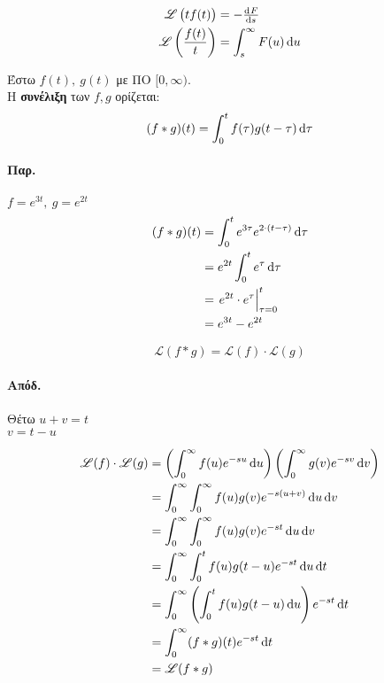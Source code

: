 \documentclass[11pt,a4paper,titlepage,final]{article}
\begin{document}
\begin{theorem*}{}
\begin{align*}
\mathscr L\left( t f(t)\right) &= - \od{F}{s} \\
\mathscr L \left( \frac{f(t)}{t}\right) &= \int_s^\infty F(u) \dif u
\end{align*}

\end{theorem*}

\begin{defn*}{}
Έστω \(f(t),\ g(t)\) με ΠΟ \( [0,\infty) \). \\
Η \textbf{συνέλιξη} των \(f,g\) ορίζεται:
\[
(f*g)(t) = \int_0^t f(\tau)g(t-\tau)\dif\tau
\]
\end{defn*}

\paragraph{Παρ.}
\(f=e^{3t},\ g=e^{2t}\)
\begin{align*}
(f*g)(t) &= \int_0^t e^{3\tau} e^{2\cdot(t-\tau)}\dif \tau
\\ &=
e^{2t} \int_0^t e^\tau \dif\tau \\
&= \left. e^{2t} \cdot e^\tau  \right|_{\tau=0}^t
\\ &= e^{3t}-e^{2t}
\end{align*}

\begin{theorem*}{}
\[
\mathscr L \left(
f * g
\right) = \mathscr L(f) \cdot \mathscr L(g)
\]
\end{theorem*}
\paragraph{Απόδ.}
Θέτω \(u+v=t\) \\ \(v=t-u\)

\begin{align*}
\mathscr L(f) \cdot \mathscr L(g) &=
\left(
\int_0^\infty f(u) e^{-su} \dif u
\right)\left(
\int_0^\infty g(v)e^{-sv}\dif v
\right)
\\
&=
\int_0^\infty \int_0^\infty f(u)g(v)e^{-s(u+v)}\dif u \dif v
\\ &=
\int_0^\infty \int_0^\infty f(u)g(v) e^{-st} \dif u \dif v
\\ &= \int_0^\infty \int_0^t f(u)g(t - u)e^{-st} \dif u \dif t
\\ &= \int_0^\infty \left(
\int_0^t f(u) g(t-u) \dif u
\right) e^{-st} \dif t
\\ &= \int_0^\infty (f*g)(t)e^{-st} \dif t\\
&= \mathscr L(f*g)
\end{align*}
\end{document}
